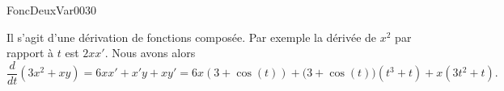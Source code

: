 
\begin{corrige}{FoncDeuxVar0030}

	Il s'agit d'une dérivation de fonctions composée. Par exemple la dérivée de $x^2$ par rapport à $t$ est $2xx'$. Nous avons alors
	\begin{equation}
		\frac{ d }{ dt }(3x^2+xy)=6xx'+x'y+xy'=6x(3+\cos(t))+\big( 3+\cos(t) \big)(t^3+t)+x(3t^2+t).
	\end{equation}

\end{corrige}
